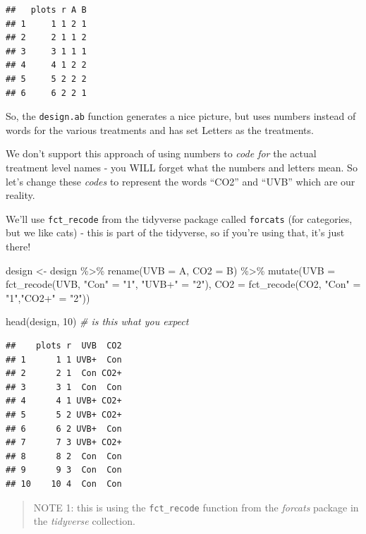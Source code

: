\documentclass[
]{book}
\newenvironment{Shaded}{\begin{snugshade}}{\end{snugshade}}
\newcommand{\AttributeTok}[1]{\textcolor[rgb]{0.77,0.63,0.00}{#1}}
\newcommand{\CommentTok}[1]{\textcolor[rgb]{0.56,0.35,0.01}{\textit{#1}}}
\newcommand{\DecValTok}[1]{\textcolor[rgb]{0.00,0.00,0.81}{#1}}
\newcommand{\FunctionTok}[1]{\textcolor[rgb]{0.00,0.00,0.00}{#1}}
\newcommand{\NormalTok}[1]{#1}
\newcommand{\OtherTok}[1]{\textcolor[rgb]{0.56,0.35,0.01}{#1}}
\newcommand{\SpecialCharTok}[1]{\textcolor[rgb]{0.00,0.00,0.00}{#1}}
\newcommand{\StringTok}[1]{\textcolor[rgb]{0.31,0.60,0.02}{#1}}
\begin{document}
\begin{verbatim}
##   plots r A B
## 1     1 1 2 1
## 2     2 1 1 2
## 3     3 1 1 1
## 4     4 1 2 2
## 5     5 2 2 2
## 6     6 2 2 1
\end{verbatim}

So, the \texttt{design.ab} function generates a nice picture, but uses numbers instead of words for the various treatments and has set Letters as the treatments.

We don't support this approach of using numbers to \emph{code for} the actual treatment level names - you WILL forget what the numbers and letters mean. So let's change these \emph{codes} to represent the words ``CO2'' and ``UVB'' which are our reality.

We'll use \texttt{fct\_recode} from the tidyverse package called \texttt{forcats} (for categories, but we like cats) - this is part of the tidyverse, so if you're using that, it's just there!

\begin{Shaded}
\begin{Highlighting}[]
\NormalTok{design }\OtherTok{\textless{}{-}}\NormalTok{ design }\SpecialCharTok{\%\textgreater{}\%}
  \FunctionTok{rename}\NormalTok{(}\AttributeTok{UVB =}\NormalTok{ A, }\AttributeTok{CO2 =}\NormalTok{ B) }\SpecialCharTok{\%\textgreater{}\%} 
  \FunctionTok{mutate}\NormalTok{(}\AttributeTok{UVB =} \FunctionTok{fct\_recode}\NormalTok{(UVB, }\StringTok{"Con"} \OtherTok{=} \StringTok{"1"}\NormalTok{, }\StringTok{"UVB+"} \OtherTok{=} \StringTok{"2"}\NormalTok{),}
         \AttributeTok{CO2 =} \FunctionTok{fct\_recode}\NormalTok{(CO2, }\StringTok{"Con"} \OtherTok{=} \StringTok{"1"}\NormalTok{,}\StringTok{"CO2+"} \OtherTok{=} \StringTok{"2"}\NormalTok{))}

\FunctionTok{head}\NormalTok{(design, }\DecValTok{10}\NormalTok{) }\CommentTok{\# is this what you expect}
\end{Highlighting}
\end{Shaded}

\begin{verbatim}
##    plots r  UVB  CO2
## 1      1 1 UVB+  Con
## 2      2 1  Con CO2+
## 3      3 1  Con  Con
## 4      4 1 UVB+ CO2+
## 5      5 2 UVB+ CO2+
## 6      6 2 UVB+  Con
## 7      7 3 UVB+ CO2+
## 8      8 2  Con  Con
## 9      9 3  Con  Con
## 10    10 4  Con  Con
\end{verbatim}

\begin{quote}
NOTE 1: this is using the \texttt{fct\_recode} function from the \emph{forcats} package in the \emph{tidyverse} collection.
\end{quote}
\end{document}
